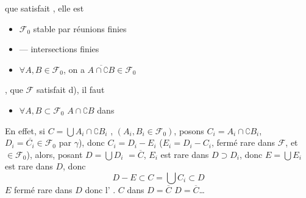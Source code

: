 \documentclass[11pt,a4paper]{article}
\begin{document}
 que  \struck{\ill{}} satisfait \ill{},
elle est 
\begin{itemize}
  \item[$\alpha$)] $\mathcal{F}_0$ stable par réunions finies
  \item[$\beta$)] --- intersections finies
  \item[$\gamma$)] $\forall A, B \in \mathcal{F}_0$, on a
  $\overline{A \cap \complement B} \in \mathcal{F}_0$
\end{itemize}
,  que $\mathcal{F}$ satisfait
d), il faut 

\begin{itemize}
  \item[$\delta$)] $\forall A, B \subset \mathcal{F}_0$  $A \cap \complement B$ dans \ill{}
\end{itemize}

En effet, si $C = \bigcup A_i \cap \complement B_i$ , $(A_i, B_i \in \mathcal{F}_0)$, posons $C_i = A_i \cap
\complement B_i$, $D_i = \overline{C_i} \in \mathcal{F}_0$ par $\gamma$),
donc $C_i = D_i - E_i$ ($E_i = D_i - C_i$, fermé rare dans $\mathcal{F}$,
et $\in \mathcal{F}_0$), alors, posant $D = \bigcup D_i$ $= \overline{C}$,
$E_i$ est   \struck{\ill{}} rare dans $D
\supset D_i$, donc $E = \bigcup E_i$ est rare dans $D$, donc
\[
  D - E \subset C = \textstyle\bigcup C_i \subset D
\]
 $E$ fermé rare dans $D$ donc l' \ill{}.
 \ill{} $C$ dans $D = \overline{C}$
  $D = \overline{C}$\ldots
\end{document}
